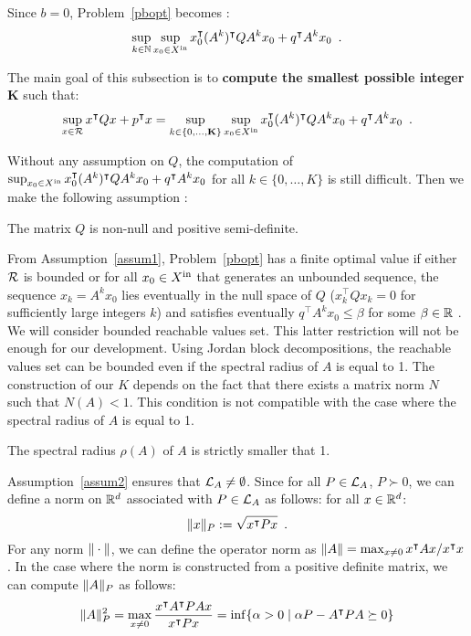 \documentclass[10pt]{article}
\begin{document}
Since $b=0$, Problem~\eqref{pbopt} becomes :
\begin{equation}
\label{pblinear}
\sup_{k\in\mathbb{N}}\sup_{x_0\in X^\mathrm{in}} x_0^\intercal (A^k)^\intercal Q A^k x_0+q^\intercal A^k x_0\enspace .
\end{equation}

The main goal of this subsection is to {\bf compute the smallest possible integer} $\mathbf K$ such that:
\[
 \sup_{x\in\mathcal{R}} x^\intercal Q x+p^\intercal x=\sup_{k\in\{0,\ldots,\mathbf K\}}\sup_{x_0\in X^\mathrm{in}} x_0^\intercal (A^k)^\intercal Q A^k x_0+q^\intercal A^k x_0\enspace .
\]

Without any assumption on $Q$, the computation of  $\sup_{x_0\in X^\mathrm{in}} x_0^\intercal (A^k)^\intercal Q A^k x_0+q^\intercal A^k x_0$ for all $k\in\{0,\ldots,K\}$ is still difficult. Then we make the following assumption : 
\begin{assumption}
\label{assum1}
The matrix $Q$ is non-null and positive semi-definite.
\end{assumption}

From Assumption~\ref{assum1}, Problem~\eqref{pbopt} has a finite optimal value if either $\mathcal{R}$ is bounded or for all 
$x_0\in X^\mathrm{in}$ that generates an unbounded sequence, the sequence $x_k=A^k x_0$ lies eventually in the null space of $Q$ ($x_k^\intercal Q x_k=0$ for sufficiently large integers $k$) and satisfies eventually $q^\intercal A^k x_0\leq \beta$ for some $\beta\in\mathbb R$ .  We will consider bounded reachable values set. This latter restriction will not be enough for our development. Using Jordan block decompositions, the reachable values set can be bounded even if the spectral radius of $A$ is equal to 1. The construction of our $K$ depends on the fact that there exists a matrix norm $N$ such that $N(A)<1$. This condition is not compatible with the case where the spectral radius of $A$ is equal to 1.

\begin{assumption}
\label{assum2}
The spectral radius $\rho(A)$ of $A$ is strictly smaller that 1.
\end{assumption}

Assumption~\ref{assum2} ensures that $\mathcal{L}_{A}\neq \emptyset$. Since for all $P\in\mathcal{L}_{A}$, $P\succ 0$, we can define a norm on $\mathbb R^d$ associated with $P\in\mathcal{L}_{A}$ as follows: for all $x\in\mathbb R^d$:
\[\| x\|_P:=\sqrt{x^\intercal P x}\enspace. \]
For any norm $\| \cdot\|$, we can define the operator norm as $\| A\|=\max_{x\neq 0} x^\intercal A x/ x^\intercal x$. In the case where the norm is constructed from a positive definite matrix, we can compute $\| A\|_P$ as follows:
\begin{equation}
\label{normdef}
    \| A\|_P^2=\max_{x\neq 0} \dfrac{x^\intercal A^\intercal P A x}{x^\intercal P x}=\inf\{\alpha>0\mid \alpha P-A^\intercal P A\succeq 0\}
\end{equation}
\end{document}
